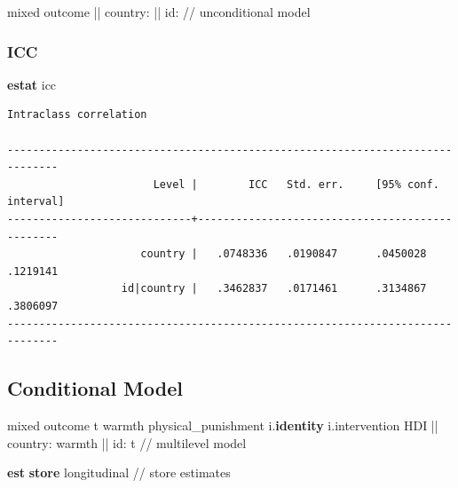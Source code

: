 \documentclass[
  letterpaper,
  DIV=11,
  numbers=noendperiod]{scrreprt}
\newenvironment{Shaded}{\begin{snugshade}}{\end{snugshade}}
\newcommand{\CommentTok}[1]{\textcolor[rgb]{0.37,0.37,0.37}{#1}}
\newcommand{\KeywordTok}[1]{\textcolor[rgb]{0.00,0.23,0.31}{\textbf{#1}}}
\newcommand{\NormalTok}[1]{\textcolor[rgb]{0.00,0.23,0.31}{#1}}
\begin{document}
\begin{Shaded}
\begin{Highlighting}[]
\NormalTok{mixed outcome || country: || id: }\CommentTok{// unconditional model}
\end{Highlighting}
\end{Shaded}

\subsubsection{ICC}\label{icc-1}

\begin{Shaded}
\begin{Highlighting}[]

\KeywordTok{estat}\NormalTok{ icc}
\end{Highlighting}
\end{Shaded}

\begin{verbatim}
Intraclass correlation

------------------------------------------------------------------------------
                       Level |        ICC   Std. err.     [95% conf. interval]
-----------------------------+------------------------------------------------
                     country |   .0748336   .0190847      .0450028    .1219141
                  id|country |   .3462837   .0171461      .3134867    .3806097
------------------------------------------------------------------------------
\end{verbatim}

\subsection{Conditional Model}\label{conditional-model-1}

\begin{Shaded}
\begin{Highlighting}[]

\NormalTok{mixed outcome t warmth physical\_punishment i.}\KeywordTok{identity}\NormalTok{ i.intervention HDI || country: warmth || id: t }\CommentTok{// multilevel model}

\KeywordTok{est} \KeywordTok{store}\NormalTok{ longitudinal }\CommentTok{// store estimates}
\end{Highlighting}
\end{Shaded}
\end{document}
